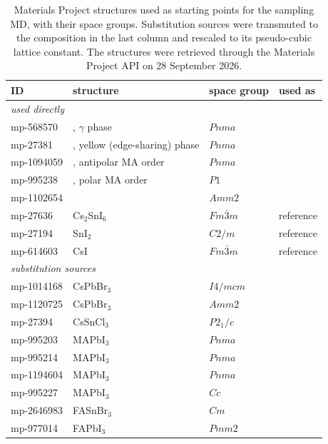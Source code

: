 \begin{table}[htbp]
  \centering
  \caption{Materials Project\cite{mp2013} structures used as starting points for the sampling MD,
    with their space groups. Substitution sources were transmuted to the composition in the last
    column and rescaled to its pseudo-cubic lattice constant. The structures were retrieved through
    the Materials Project API on 28 September 2026.}
  \label{tab:mp}
  \begin{tabular}{llll}
    \toprule
    ID & structure & space group & used as \\
    \midrule
    \multicolumn{4}{l}{\emph{used directly}} \\
    mp-568570 & \CsSnI{}, $\gamma$ phase & $Pnma$ & \CsSnI{} \\
    mp-27381 & \CsSnI{}, yellow (edge-sharing) phase & $Pnma$ & \CsSnI{} \\
    mp-1094059 & \MASnI{}, antipolar MA order & $Pnma$ & \MASnI{} \\
    mp-995238 & \MASnI{}, polar MA order & $P1$ & \MASnI{} \\
    mp-1102654 & \FASnI{} & $Amm2$ & \FASnI{} \\
    mp-27636 & Cs$_2$SnI$_6$ & $Fm\bar{3}m$ & reference \\
    mp-27194 & SnI$_2$ & $C2/m$ & reference \\
    mp-614603 & CsI & $Fm\bar{3}m$ & reference \\
    \midrule
    \multicolumn{4}{l}{\emph{substitution sources}} \\
    mp-1014168 & CsPbBr$_3$ & $I4/mcm$ & \CsSnI{} \\
    mp-1120725 & CsPbBr$_3$ & $Amm2$ & \CsSnI{} \\
    mp-27394 & CsSnCl$_3$ & $P2_1/c$ & \CsSnI{} \\
    mp-995203 & MAPbI$_3$ & $Pnma$ & \MASnI{} \\
    mp-995214 & MAPbI$_3$ & $Pnma$ & \MASnI{} \\
    mp-1194604 & MAPbI$_3$ & $Pnma$ & \MASnI{} \\
    mp-995227 & MAPbI$_3$ & $Cc$ & \MASnI{} \\
    mp-2646983 & FASnBr$_3$ & $Cm$ & \FASnI{} \\
    mp-977014 & FAPbI$_3$ & $Pmm2$ & \FASnI{} \\
    \bottomrule
  \end{tabular}
\end{table}

